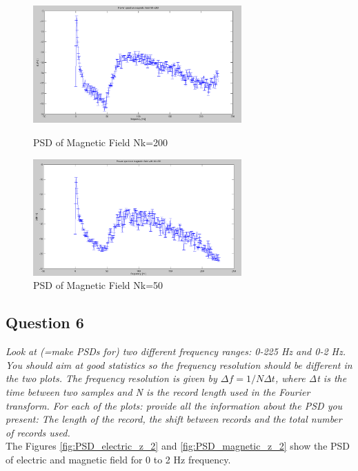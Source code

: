 \documentclass{article}
\begin{document}
\begin{figure}[htb!]
\begin{minipage}[c]{0.5\linewidth}
\centering
\includegraphics[width=8cm]{Figures/PSD_magnetic_200.png}
\caption{PSD of Magnetic Field Nk=200}
\label{fig:PSD_magnetic_200}
\end{minipage}
\hspace{0.1cm}
\begin{minipage}[c]{0.5\linewidth}
\centering
\includegraphics[width=8cm]{Figures/PSD_magnetic_50.png}
\caption{PSD of Magnetic Field Nk=50}
\label{fig:PSD_magnetic_50}
\end{minipage}
\end{figure}



\subsection{Question 6}
\textit{Look at (=make PSDs for) two different frequency ranges: 0-225 Hz and 0-2 Hz. You should aim at good statistics so the frequency resolution should be different in the two plots. The frequency resolution is given by $Δf=1/NΔt$, where Δt is the time between two samples and N is the record length used in the Fourier transform. For each of the plots: provide all the information about the PSD you present: The length of the record, the shift between records and the total number of records used.}\\

The Figures \ref{fig:PSD_electric_z_2} and \ref{fig:PSD_magnetic_z_2} show the PSD of electric and magnetic field for 0 to 2 Hz frequency. 
\end{document}
